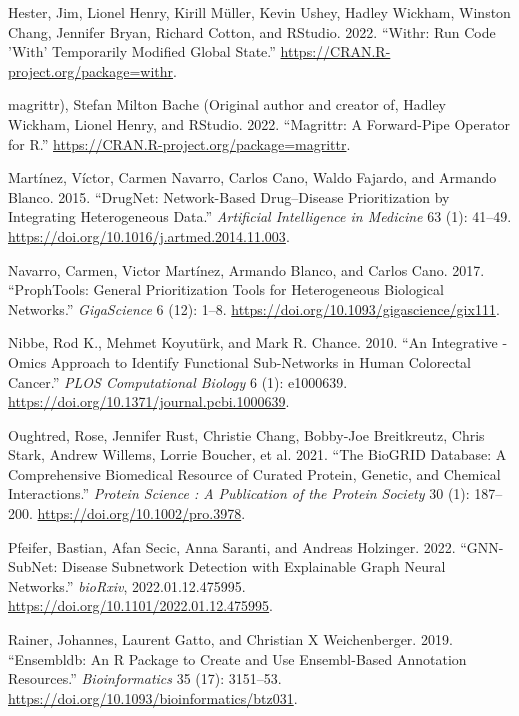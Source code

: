 \documentclass{article}
\newlength{\cslhangindent}
\newlength{\cslentryspacingunit} %
\newenvironment{CSLReferences}[2] %
 {%
  \setlength{\parindent}{0pt}
  \ifodd #1
  \let\oldpar\par
  \def\par{\hangindent=\cslhangindent\oldpar}
  \fi
  \setlength{\parskip}{#2\cslentryspacingunit}
 }%
 {}
\begin{document}
\begin{CSLReferences}{1}{0}
\leavevmode\hypertarget{ref-hester_withr_2022}{}%
Hester, Jim, Lionel Henry, Kirill Müller, Kevin Ushey, Hadley Wickham,
Winston Chang, Jennifer Bryan, Richard Cotton, and RStudio. 2022.
{``Withr: {Run} {Code} '{With}' {Temporarily} {Modified} {Global}
{State}.''} \url{https://CRAN.R-project.org/package=withr}.

\leavevmode\hypertarget{ref-magrittr_magrittr_2022}{}%
magrittr), Stefan Milton Bache (Original author and creator of, Hadley
Wickham, Lionel Henry, and RStudio. 2022. {``Magrittr: {A}
{Forward}-{Pipe} {Operator} for {R}.''}
\url{https://CRAN.R-project.org/package=magrittr}.

\leavevmode\hypertarget{ref-martinez_drugnet_2015}{}%
Martínez, Víctor, Carmen Navarro, Carlos Cano, Waldo Fajardo, and
Armando Blanco. 2015. {``{DrugNet}: {Network}-Based Drug--Disease
Prioritization by Integrating Heterogeneous Data.''} \emph{Artificial
Intelligence in Medicine} 63 (1): 41--49.
\url{https://doi.org/10.1016/j.artmed.2014.11.003}.

\leavevmode\hypertarget{ref-navarro_prophtools_2017}{}%
Navarro, Carmen, Victor Martínez, Armando Blanco, and Carlos Cano. 2017.
{``{ProphTools}: General Prioritization Tools for Heterogeneous
Biological Networks.''} \emph{GigaScience} 6 (12): 1--8.
\url{https://doi.org/10.1093/gigascience/gix111}.

\leavevmode\hypertarget{ref-nibbe_integrative_2010}{}%
Nibbe, Rod K., Mehmet Koyutürk, and Mark R. Chance. 2010. {``An
{Integrative} -Omics {Approach} to {Identify} {Functional}
{Sub}-{Networks} in {Human} {Colorectal} {Cancer}.''} \emph{PLOS
Computational Biology} 6 (1): e1000639.
\url{https://doi.org/10.1371/journal.pcbi.1000639}.

\leavevmode\hypertarget{ref-oughtred_biogrid_2021}{}%
Oughtred, Rose, Jennifer Rust, Christie Chang, Bobby‐Joe Breitkreutz,
Chris Stark, Andrew Willems, Lorrie Boucher, et al. 2021. {``The
{BioGRID} Database: {A} Comprehensive Biomedical Resource of Curated
Protein, Genetic, and Chemical Interactions.''} \emph{Protein Science :
A Publication of the Protein Society} 30 (1): 187--200.
\url{https://doi.org/10.1002/pro.3978}.

\leavevmode\hypertarget{ref-pfeifer_gnn-subnet_2022}{}%
Pfeifer, Bastian, Afan Secic, Anna Saranti, and Andreas Holzinger. 2022.
{``{GNN}-{SubNet}: Disease Subnetwork Detection with Explainable {Graph}
{Neural} {Networks}.''} \emph{bioRxiv}, 2022.01.12.475995.
\url{https://doi.org/10.1101/2022.01.12.475995}.

\leavevmode\hypertarget{ref-rainer_ensembldb_2019}{}%
Rainer, Johannes, Laurent Gatto, and Christian X Weichenberger. 2019.
{``Ensembldb: An {R} Package to Create and Use {Ensembl}-Based
Annotation Resources.''} \emph{Bioinformatics} 35 (17): 3151--53.
\url{https://doi.org/10.1093/bioinformatics/btz031}.


\end{CSLReferences}
\end{document}
